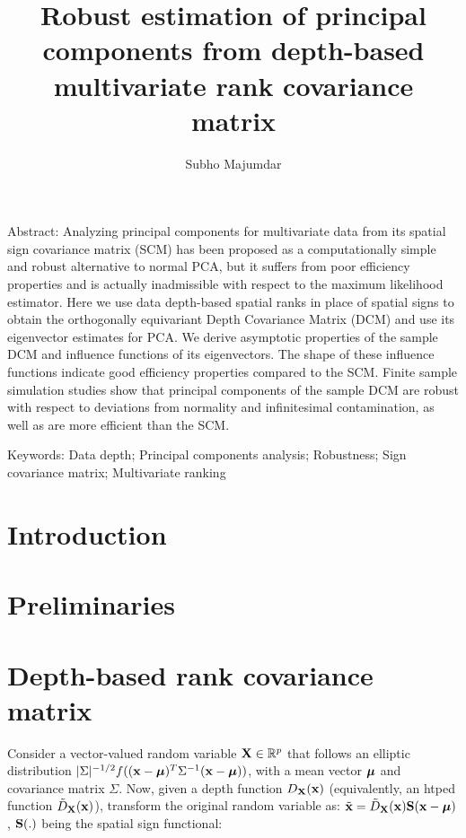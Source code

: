 \documentclass[fleqn,12pt]{article}
\begin{document}
\newtheorem{Theorem}{Theorem}[section]
\newtheorem{Lemma}[Theorem]{Lemma}
\newtheorem{Corollary}[Theorem]{Corollary}

\title{Robust estimation of principal components from depth-based multivariate rank covariance matrix}
\date{}
\author{Subho Majumdar}
\maketitle

Abstract:
Analyzing principal components for multivariate data from its spatial sign covariance matrix (SCM) has been proposed as a computationally simple and robust alternative to normal PCA, but it suffers from poor efficiency properties and is actually inadmissible with respect to the maximum likelihood estimator. Here we use data depth-based spatial ranks in place of spatial signs to obtain the orthogonally equivariant Depth Covariance Matrix (DCM) and use its eigenvector estimates for PCA. We derive asymptotic properties of the sample DCM and influence functions of its eigenvectors. The shape of these influence functions indicate good efficiency properties compared to the SCM. Finite sample simulation studies show that principal components of the sample DCM are robust with respect to deviations from normality and infinitesimal contamination, as well as are more efficient than the SCM.

Keywords:
Data depth; Principal components analysis; Robustness; Sign covariance matrix; Multivariate ranking

\section{Introduction}

\section{Preliminaries}

\section{Depth-based rank covariance matrix}

Consider a vector-valued random variable ${\mathbf{X}} \in \mathbb{R}^p$ that follows an elliptic distribution $|\Sigma|^{-1/2} f(({\bf{x}} - {\boldsymbol{\mu}})^T \Sigma^{-1} ({\bf{x}} - {\boldsymbol{\mu}}))$, with a mean vector ${\boldsymbol{\mu}}$ and covariance matrix $\Sigma$. Now, given a depth function $D_{{\mathbf{X}}}({\bf{x}})$ (equivalently, an htped function $\tilde D_{\mathbf{X}}({\bf{x}})$), transform the original random variable as: $\tilde {{\bf{x}}} = \tilde D_{\mathbf{X}}({\bf{x}}) {\mathbf{S}}({\bf{x}} - {\boldsymbol{\mu}})$, ${\mathbf{S}}(.)$ being the spatial sign functional:
\end{document}
